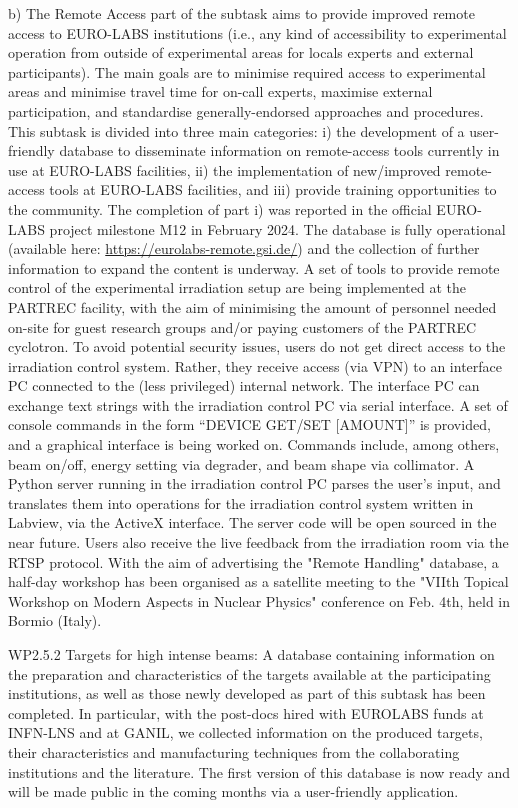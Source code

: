 b) The Remote Access part of the subtask aims to provide improved remote access to EURO-LABS institutions (i.e., any kind of accessibility to experimental operation from outside of experimental areas for locals experts and external participants). The main goals are to minimise required access to experimental areas and minimise travel time for on-call experts, maximise external participation, and standardise generally-endorsed approaches and procedures. This subtask is divided into three main categories: i) the development of a user-friendly database to disseminate information on remote-access tools currently in use at EURO-LABS facilities, ii) the implementation of new/improved remote-access tools at EURO-LABS facilities, and iii) provide training opportunities to the community. The completion of part i) was reported in the official EURO-LABS project milestone M12 in February 2024. The database is fully operational (available here: \url{https://eurolabs-remote.gsi.de/}) and the collection of further information to expand the content is underway. A set of tools to provide remote control of the experimental irradiation setup are being implemented at the PARTREC facility, with the aim of minimising the amount of personnel needed on-site for guest research groups and/or paying customers of the PARTREC cyclotron.
To avoid potential security issues, users do not get direct access to the irradiation control system. Rather, they receive access (via VPN) to an interface PC connected to the (less privileged) internal network.
The interface PC can exchange text strings with the irradiation control PC via serial interface. A set of console commands in the form “DEVICE GET/SET [AMOUNT]” is provided, and a graphical interface is being worked on. Commands include, among others, beam on/off, energy setting via degrader, and beam shape via collimator.
A Python server running in the irradiation control PC parses the user’s input, and translates them into operations for the irradiation control system written in Labview, via the ActiveX interface. The server code will be open sourced in the near future.
Users also receive the live feedback from the irradiation room via the RTSP protocol. With the aim of advertising the "Remote Handling" database, a half-day workshop has been organised as a satellite meeting to the "VIIth Topical Workshop on Modern Aspects in Nuclear Physics" conference on Feb. 4th, held in Bormio (Italy). 


WP2.5.2 Targets for high intense beams: A database containing information on the preparation and characteristics of the targets available at the participating institutions, as well as those newly developed as part of this subtask has been completed. In particular, with the post-docs hired with EUROLABS funds at INFN-LNS and at GANIL, we collected information on the produced targets, their characteristics and manufacturing techniques from the collaborating institutions and the literature. The first version of this database is now ready and will be made public in the coming months via a user-friendly application.

